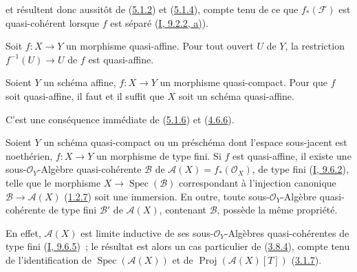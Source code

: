 
et résultent donc aussitôt de (\hyperref[II.5.1.2-fr]{5.1.2}) et
(\hyperref[II.5.1.4-fr]{5.1.4}), compte tenu de ce que
$f_*(\mathcal{F})$ est quasi-cohérent lorsque $f$ est séparé
(\hyperref[I.9.2.2-fr]{I, 9.2.2, a)}).

\begin{corollary}[5.1.7]
\label{II.5.1.7-fr}
Soit $f:X\to Y$ un morphisme quasi-affine. Pour tout ouvert $U$ de $Y$, la
restriction $f^{-1}(U)\to U$ de $f$ est quasi-affine.
\end{corollary}

\begin{corollary}[5.1.8]
\label{II.5.1.8-fr}
Soient $Y$ un schéma affine, $f:X\to Y$ un morphisme quasi-compact. Pour que
$f$ soit quasi-affine, il faut et il suffit que $X$ soit un schéma
quasi-affine.
\end{corollary}

C'est une conséquence immédiate de (\hyperref[II.5.1.6-fr]{5.1.6}) et
(\hyperref[II.4.6.6-fr]{4.6.6}).

\begin{corollary}[5.1.9]
\label{II.5.1.9-fr}
Soient $Y$ un schéma quasi-compact ou un préschéma dont l'espace sous-jacent
est noethérien, $f:X\to Y$ un morphisme de type fini. Si $f$ est
quasi-affine, il existe une sous-$\mathcal{O}_Y$-Algèbre quasi-cohérente
$\mathcal{B}$ de $\mathcal{A}(X)=f_*(\mathcal{O}_X)$, de type fini
(\hyperref[I.9.6.2-fr]{I, 9.6.2}), telle que le morphisme
$X\to\operatorname{Spec}(\mathcal{B})$ correspondant à l'injection canonique
$\mathcal{B}\to\mathcal{A}(X)$ (\hyperref[II.1.2.7-fr]{1.2.7}) soit une
immersion. En outre, toute sous-$\mathcal{O}_Y$-Algèbre quasi-cohérente de
type fini $\mathcal{B}'$ de $\mathcal{A}(X)$, contenant $\mathcal{B}$,
possède la même propriété.
\end{corollary}

En effet, $\mathcal{A}(X)$ est limite inductive de ses
sous-$\mathcal{O}_Y$-Algèbres quasi-cohérentes de type fini
(\hyperref[I.9.6.5-fr]{I, 9.6.5})~; le résultat est alors un cas particulier
de (\hyperref[II.3.8.4-fr]{3.8.4}), compte tenu de l'identification de
$\operatorname{Spec}(\mathcal{A}(X))$ et de
$\operatorname{Proj}(\mathcal{A}(X)[T])$
(\hyperref[II.3.1.7-fr]{3.1.7}).

